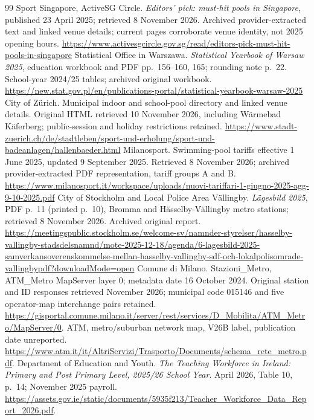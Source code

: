 \begin{thebibliography}{99}
 Sport Singapore, ActiveSG Circle. \textit{Editors' pick:
must-hit pools in Singapore}, published 23 April 2025; retrieved 8 November
2026. Archived provider-extracted text and linked venue details; current
pages corroborate venue identity, not 2025 opening hours.
\url{https://www.activesgcircle.gov.sg/read/editors-pick-must-hit-pools-in-singapore}
 Statistical Office in Warszawa. \textit{Statistical
Yearbook of Warsaw 2025}, education workbook and PDF pp.~156--160, 165;
rounding note p.~22. School-year 2024/25 tables; archived original workbook.
\url{https://new.stat.gov.pl/en/publications-portal/statistical-yearbook-warsaw-2025}
 City of Z\"urich. Municipal indoor and school-pool directory
and linked venue details. Original HTML retrieved 10 November 2026, including
W\"armebad K\"aferberg; public-session and holiday restrictions retained.
\url{https://www.stadt-zuerich.ch/de/stadtleben/sport-und-erholung/sport-und-badeanlagen/hallenbaeder.html}
 Milanosport. Swimming-pool tariffs effective 1 June
2025, updated 9 September 2025. Retrieved 8 November 2026; archived
provider-extracted PDF representation, tariff groups A and B.
\url{https://www.milanosport.it/workspace/uploads/nuovi-tariffari-1-giugno-2025-agg-9-10-2025.pdf}
 City of Stockholm and Local Police Area
V\"allingby. \textit{L\"agesbild 2025}, PDF p.~11 (printed p.~10),
Bromma and H\"asselby-V\"allingby metro stations; retrieved 8 November 2026.
Archived original report.
\begingroup\def\UrlBreaks{\do\/\do-\do\?}\url{https://meetingspublic.stockholm.se/welcome-sv/namnder-styrelser/hasselby-vallingby-stadsdelsnamnd/mote-2025-12-18/agenda/6-lagesbild-2025-samverkansoverenskommelse-mellan-hasselby-vallingby-sdf-och-lokalpolisomrade-vallingbypdf?downloadMode=open}\endgroup
{} Comune di Milano. Stazioni\_Metro, ATM\_Metro MapServer layer 0; metadata date 16 October 2024. Original station and ID responses retrieved November 2026; municipal code 015146 and five operator-map interchange pairs retained.
\url{https://gisportal.comune.milano.it/server/rest/services/D_Mobilita/ATM_Metro/MapServer/0}.
ATM, metro/suburban network map, V26B label, publication date unreported.
\url{https://www.atm.it/it/AltriServizi/Trasporto/Documents/schema_rete_metro.pdf}.
 Department of Education and Youth.
\textit{The Teaching Workforce in Ireland: Primary and Post Primary Level,
2025/26 School Year}. April 2026, Table 10, p.~14; November 2025 payroll.
\url{https://assets.gov.ie/static/documents/5935f213/Teacher_Workforce_Data_Report_2026.pdf}.

\end{thebibliography}
